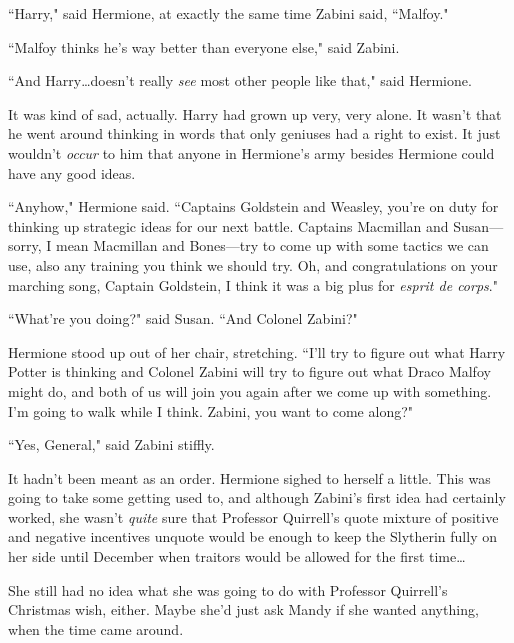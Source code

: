 ``Harry," said Hermione, at exactly the same time Zabini said, ``Malfoy."

``Malfoy thinks he's way better than everyone else," said Zabini.

``And Harry…doesn't really \emph{see} most other people like that," said Hermione.

It was kind of sad, actually. Harry had grown up very, very alone. It wasn't that he went around thinking in words that only geniuses had a right to exist. It just wouldn't \emph{occur} to him that anyone in Hermione's army besides Hermione could have any good ideas.

``Anyhow," Hermione said. ``Captains Goldstein and Weasley, you're on duty for thinking up strategic ideas for our next battle. Captains Macmillan and Susan—sorry, I mean Macmillan and Bones—try to come up with some tactics we can use, also any training you think we should try. Oh, and congratulations on your marching song, Captain Goldstein, I think it was a big plus for \emph{esprit de corps}."

``What're you doing?" said Susan. ``And Colonel Zabini?"

Hermione stood up out of her chair, stretching. ``I'll try to figure out what Harry Potter is thinking and Colonel Zabini will try to figure out what Draco Malfoy might do, and both of us will join you again after we come up with something. I'm going to walk while I think. Zabini, you want to come along?"

``Yes, General," said Zabini stiffly.

It hadn't been meant as an order. Hermione sighed to herself a little. This was going to take some getting used to, and although Zabini's first idea had certainly worked, she wasn't \emph{quite} sure that Professor Quirrell's quote mixture of positive and negative incentives unquote would be enough to keep the Slytherin fully on her side until December when traitors would be allowed for the first time…

She still had no idea what she was going to do with Professor Quirrell's Christmas wish, either. Maybe she'd just ask Mandy if she wanted anything, when the time came around.

